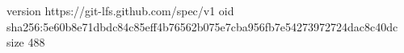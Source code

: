 version https://git-lfs.github.com/spec/v1
oid sha256:5e60b8e71dbdc84c85eff4b76562b075e7cba956fb7e54273972724dac8c40dc
size 488
